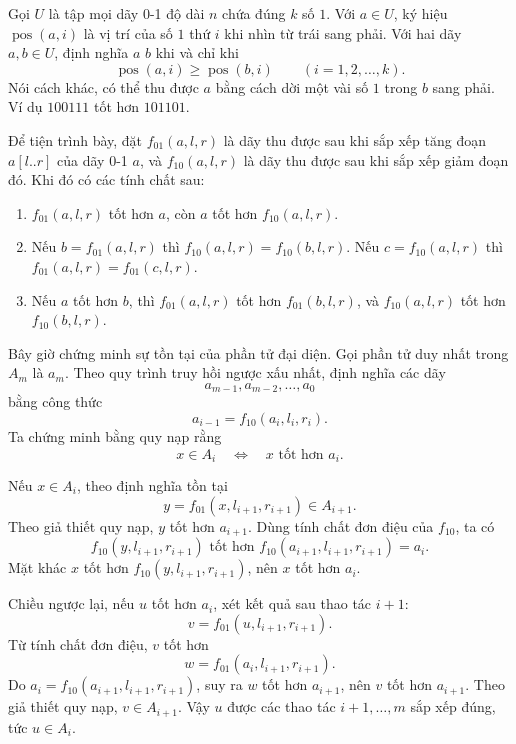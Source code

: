 \documentclass[11pt]{article}
\begin{document}
Gọi \(U\) là tập mọi dãy 0-1 độ dài \(n\) chứa đúng \(k\) số \(1\). Với
\(a\in U\), ký hiệu \(\operatorname{pos}(a,i)\) là vị trí của số \(1\) thứ
\(i\) khi nhìn từ trái sang phải. Với hai dãy \(a,b\in U\), định nghĩa \(a\)
 \(b\) khi và chỉ khi
\[
  \operatorname{pos}(a,i)\ge \operatorname{pos}(b,i)
  \qquad (i=1,2,\ldots,k).
\]
Nói cách khác, có thể thu được \(a\) bằng cách dời một vài số \(1\) trong
\(b\) sang phải. Ví dụ \(100111\) tốt hơn \(101101\).

Để tiện trình bày, đặt \(f_{01}(a,l,r)\) là dãy thu được sau khi sắp xếp tăng
đoạn \(a[l..r]\) của dãy 0-1 \(a\), và \(f_{10}(a,l,r)\) là dãy thu được sau
khi sắp xếp giảm đoạn đó. Khi đó có các tính chất sau:
\begin{enumerate}
  \item \(f_{01}(a,l,r)\) tốt hơn \(a\), còn \(a\) tốt hơn
  \(f_{10}(a,l,r)\).
  \item Nếu \(b=f_{01}(a,l,r)\) thì
  \(f_{10}(a,l,r)=f_{10}(b,l,r)\). Nếu \(c=f_{10}(a,l,r)\) thì
  \(f_{01}(a,l,r)=f_{01}(c,l,r)\).
  \item Nếu \(a\) tốt hơn \(b\), thì
  \(f_{01}(a,l,r)\) tốt hơn \(f_{01}(b,l,r)\), và
  \(f_{10}(a,l,r)\) tốt hơn \(f_{10}(b,l,r)\).
\end{enumerate}

Bây giờ chứng minh sự tồn tại của phần tử đại diện. Gọi phần tử duy nhất trong
\(A_m\) là \(a_m\). Theo quy trình truy hồi ngược xấu nhất, định nghĩa các
dãy
\[
  a_{m-1},a_{m-2},\ldots,a_0
\]
bằng công thức
\[
  a_{i-1}=f_{10}(a_i,l_i,r_i).
\]
Ta chứng minh bằng quy nạp rằng
\[
  x\in A_i
  \quad\Longleftrightarrow\quad
  x\text{ tốt hơn }a_i.
\]

Nếu \(x\in A_i\), theo định nghĩa tồn tại
\[
  y=f_{01}(x,l_{i+1},r_{i+1})\in A_{i+1}.
\]
Theo giả thiết quy nạp, \(y\) tốt hơn \(a_{i+1}\). Dùng tính chất đơn điệu của
\(f_{10}\), ta có
\[
  f_{10}(y,l_{i+1},r_{i+1})
  \text{ tốt hơn }
  f_{10}(a_{i+1},l_{i+1},r_{i+1})=a_i.
\]
Mặt khác \(x\) tốt hơn \(f_{10}(y,l_{i+1},r_{i+1})\), nên \(x\) tốt hơn
\(a_i\).

Chiều ngược lại, nếu \(u\) tốt hơn \(a_i\), xét kết quả sau thao tác
\(i+1\):
\[
  v=f_{01}(u,l_{i+1},r_{i+1}).
\]
Từ tính chất đơn điệu, \(v\) tốt hơn
\[
  w=f_{01}(a_i,l_{i+1},r_{i+1}).
\]
Do \(a_i=f_{10}(a_{i+1},l_{i+1},r_{i+1})\), suy ra \(w\) tốt hơn
\(a_{i+1}\), nên \(v\) tốt hơn \(a_{i+1}\). Theo giả thiết quy nạp,
\(v\in A_{i+1}\). Vậy \(u\) được các thao tác \(i+1,\ldots,m\) sắp xếp đúng,
tức \(u\in A_i\).
\end{document}
